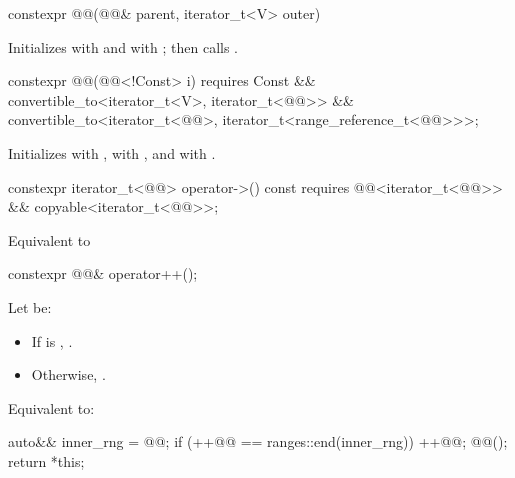 %
\begin{itemdecl}
constexpr @@(@@& parent, iterator_t<V> outer)
\end{itemdecl}

\begin{itemdescr}
\pnum
\effects
Initializes  with  and
 with ; then calls .
\end{itemdescr}

%
\begin{itemdecl}
constexpr @@(@@<!Const> i)
  requires Const &&
           convertible_to<iterator_t<V>, iterator_t<@@>> &&
           convertible_to<iterator_t<@@>,
                          iterator_t<range_reference_t<@@>>>;
\end{itemdecl}

\begin{itemdescr}
\pnum
\effects
Initializes  with ,
 with , and
 with .
\end{itemdescr}

%
\begin{itemdecl}
constexpr iterator_t<@@> operator->() const
  requires @@<iterator_t<@@>> && copyable<iterator_t<@@>>;
\end{itemdecl}

\begin{itemdescr}
\pnum
\effects
Equivalent to 
\end{itemdescr}

%
\begin{itemdecl}
constexpr @@& operator++();
\end{itemdecl}

\begin{itemdescr}
\pnum
Let  be:
\begin{itemize}
\item If  is , .
\item Otherwise, .
\end{itemize}

\pnum
\effects
Equivalent to:
\begin{codeblock}
auto&& inner_rng = @@;
if (++@@ == ranges::end(inner_rng)) {
  ++@@;
  @@();
}
return *this;
\end{codeblock}
\end{itemdescr}

